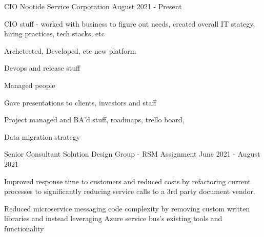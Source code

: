 

\begin{cventries}

\cventry
{CIO} %
{Nootide Service Corporation} %
{} %
{August 2021 - Present} %
{
	\begin{cvitems} %
		\item {CIO stuff - worked with business to figure out needs, created overall IT stategy, hiring practices, tech stacks, etc}
		\item {Archetected, Developed, etc new platform }
		\item {Devops and release stuff}
		\item {Managed people}
		\item {Gave presentations to clients, investors and staff}
		\item {Project managed and BA'd stuff, roadmaps, trello board, }
		\item {Data migration strategy}
	\end{cvitems}
}

\cventry
{Senior Consultant} %
{Solution Design Group - RSM Assignment} %
{} %
{June 2021 - August 2021} %
{
	\begin{cvitems} %
		\item {Improved response time to customers and reduced costs by refactoring current processes to significantly reducing service calls to a 3rd party document vendor.}
		\item {Reduced microservice messaging code complexity by removing custom written libraries and instead leveraging Azure service bus’s existing tools and functionality}
	\end{cvitems}
}


\end{cventries}
